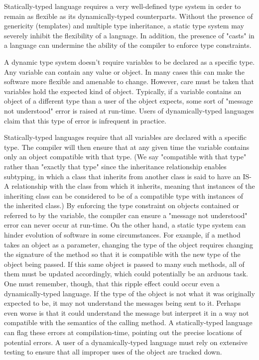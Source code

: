 \documentclass[12pt,a4paper,final,twoside,titlepage]{book}
\begin{document}
Statically-typed language requires a very well-defined type system in order to remain as flexible as its dynamically-typed counterparts. Without the presence of genericity (templates) and multiple type inheritance, a static type system may severely inhibit the flexibility of a language. In addition, the presence of "casts" in a language can undermine the ability of the compiler to enforce type constraints.

A dynamic type system doesn't require variables to be declared as a specific type. Any variable can contain any value or object. In many cases this can make the software more flexible and amenable to change. However, care must be taken that variables hold the expected kind of object. Typically, if a variable contains an object of a different type than a user of the object expects, some sort of "message not understood" error is raised at run-time. Users of dynamically-typed languages claim that this type of error is infrequent in practice.

Statically-typed languages require that all variables are declared with a specific type. The compiler will then ensure that at any given time the variable contains only an object compatible with that type. (We say "compatible with that type" rather than "exactly that type" since the inheritance relationship enables subtyping, in which a class that inherits from another class is said to have an IS-A relationship with the class from which it inherits, meaning that instances of the inheriting class can be considered to be of a compatible type with instances of the inherited class.) By enforcing the type constraint on objects contained or referred to by the variable, the compiler can ensure a "message not understood" error can never occur at run-time. On the other hand, a static type system can hinder evolution of software in some circumstances. For example, if a method takes an object as a parameter, changing the type of the object requires changing the signature of the method so that it is compatible with the new type of the object being passed. If this same object is passed to many such methods, all of them must be updated accordingly, which could potentially be an arduous task. One must remember, though, that this ripple effect could occur even a dynamically-typed language. If the type of the object is not what it was originally expected to be, it may not understand the messages being sent to it. Perhaps even worse is that it could understand the message but interpret it in a way not compatible with the semantics of the calling method. A statically-typed language can flag these errors at compilation-time, pointing out the precise locations of potential errors. A user of a dynamically-typed language must rely on extensive testing to ensure that all improper uses of the object are tracked down.
\end{document}

